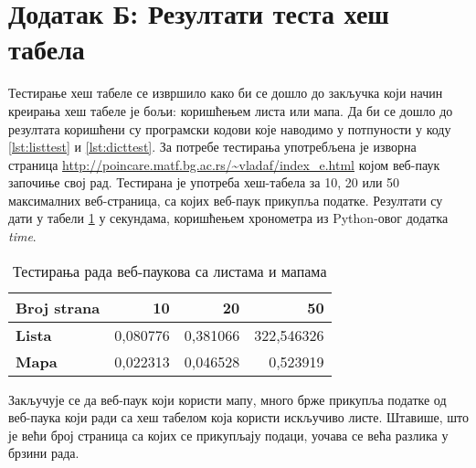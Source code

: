 \appendix
\setcounter{secnumdepth}{0}
\section{Додатак Б: Резултати теста хеш табела}\label{sec:dodatakb}

Тестирање хеш табеле се извршило како би се дошло до закључка који начин
креирања хеш табеле је бољи: коришћењем листа или мапа. Да би се дошло до
резултата коришћени су програмски кодови које наводимо у потпуности у коду \ref{lst:listtest} и \ref{lst:dicttest}.
За потребе тестирања употребљена је изворна страница \url{http://poincare.matf.bg.ac.rs/~vladaf/index_e.html}
којом веб-паук започиње свој рад.
Тестирана је употреба хеш-табела за 10, 20 или 50 максималних
веб-страница, са којих веб-паук прикупља податке. Резултати су дати у табели \ref{tabele:list-dict}
у секундама, коришћењем хронометра из Python-овог додатка \emph{time}.

\lstset{numbers=left}


\lstset{numbers=left}


\begin{table}[h]
\centering
\begin{tabular}{|l|r|r|r|} \hline
\textbf{Broj strana} & 10 & 20 & 50\\ \hline
\textbf{Lista} & 0,080776 & 0,381066 & 322,546326\\ \hline
\textbf{Mapa} & 0,022313 & 0,046528 & 0,523919\\ \hline
\end{tabular}
\caption{Тестирања рада веб-паукова са листама и мапама}
\label{tabele:list-dict}
\end{table}

Закључује се да веб-паук који користи мапу, много брже прикупља
податке од веб-паука који ради са хеш табелом која користи искључиво листе.
Штавише, што је већи број страница са којих се прикупљају подаци,
уочава се већа разлика у брзини рада.
